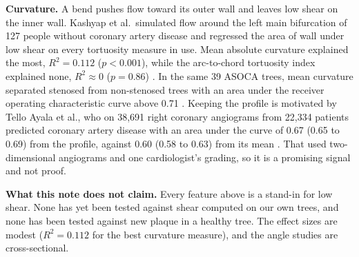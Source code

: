 \documentclass[11pt,a4paper]{article}
\begin{document}
\textbf{Curvature.} A bend pushes flow toward its outer wall and leaves low shear on the inner wall.
Kashyap et al.\ simulated flow around the left main bifurcation of 127 people without coronary artery disease and regressed the area of wall under low shear on every tortuosity measure in use.
Mean absolute curvature explained the most, $R^2 = 0.112$ ($p < 0.001$), while the arc-to-chord tortuosity index explained none, $R^2 \approx 0$ ($p = 0.86$) \cite{kashyap2022tortuosity}.
In the same 39 ASOCA trees, mean curvature separated stenosed from non-stenosed trees with an area under the receiver operating characteristic curve above 0.71 \cite{zhang2024curvature}.
Keeping the profile is motivated by Tello Ayala et al., who on 38{,}691 right coronary angiograms from 22{,}334 patients predicted coronary artery disease with an area under the curve of 0.67 (0.65 to 0.69) from the profile, against 0.60 (0.58 to 0.63) from its mean \cite{telloayala2026tortuosity}.
That used two-dimensional angiograms and one cardiologist's grading, so it is a promising signal and not proof.

\textbf{What this note does not claim.} Every feature above is a stand-in for low shear. None has yet been tested against shear computed on our own trees, and none has been tested against new plaque in a healthy tree.
The effect sizes are modest ($R^2 = 0.112$ for the best curvature measure), and the angle studies are cross-sectional.

\printbibliography
\end{document}
